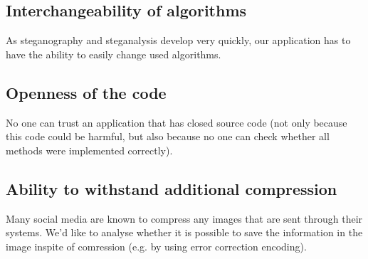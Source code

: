\subsection{Interchangeability of algorithms}
As steganography and steganalysis develop very quickly, our application
has to have the ability to easily change used algorithms.  

\subsection{Openness of the code}
No one can trust an application that has closed source code (not only because
this code could be harmful, but also because no one can check whether all
methods were implemented correctly).

\subsection{Ability to withstand additional compression}
Many social media are known to compress any images that are sent through
their systems. We'd like to analyse whether it is possible to save the information
in the image inspite of comression (e.g. by using error correction encoding).
